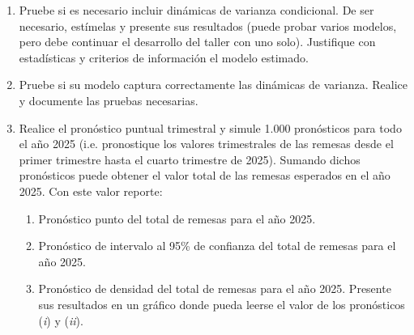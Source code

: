 \documentclass{article}
\theoremstyle{remark}
\theoremstyle{definition}
\begin{document}
\begin{enumerate}[label=\emph{\alph*})]
\begin{tcolorbox}[title=Soluci\'on 3.f]
        \end{tcolorbox}
        
    \item {Pruebe si es necesario incluir din\'amicas de varianza condicional. De ser necesario, est\'imelas y presente sus resultados (puede probar varios modelos, pero debe continuar el desarrollo del taller con uno solo). Justifique con estad\'isticas y criterios de informaci\'on el modelo estimado.}
        \begin{tcolorbox}[title=Soluci\'on 3.g]
            
        \end{tcolorbox}
    \item {Pruebe si su modelo captura correctamente las din\'amicas de varianza. Realice y documente las pruebas necesarias.}
        \begin{tcolorbox}[title=Soluci\'on 3.h]
            
        \end{tcolorbox}
    \item {Realice el pron\'ostico puntual trimestral y simule 1.000 pron\'osticos para todo el año 2025 (i.e. pronostique los valores trimestrales de las remesas desde el primer trimestre hasta el cuarto trimestre de 2025). Sumando dichos pron\'osticos puede obtener el valor total de las remesas esperados en el año 2025. Con este valor reporte:}
    \begin{enumerate}[label=(\emph{\roman*})]
        \item {Pron\'ostico punto del total de remesas para el año 2025.}
            \begin{tcolorbox}[title=Soluci\'on 3.i.i]
            
            \end{tcolorbox}
        \item {Pron\'ostico de intervalo al 95\% de confianza del total de remesas para el año 2025.}
            \begin{tcolorbox}[title=Soluci\'on 3.i.ii]
            
            \end{tcolorbox}
        \item {Pron\'ostico de densidad del total de remesas para el año 2025. Presente sus resultados en un gr\'afico donde pueda leerse el valor de los pron\'osticos (\emph{i}) y (\emph{ii}).}
            \begin{tcolorbox}[title=Soluci\'on 3.i.iii]
            
            \end{tcolorbox}
    \end{enumerate}
\end{enumerate}

\nocite{*}

\printbibliography
\end{document}
